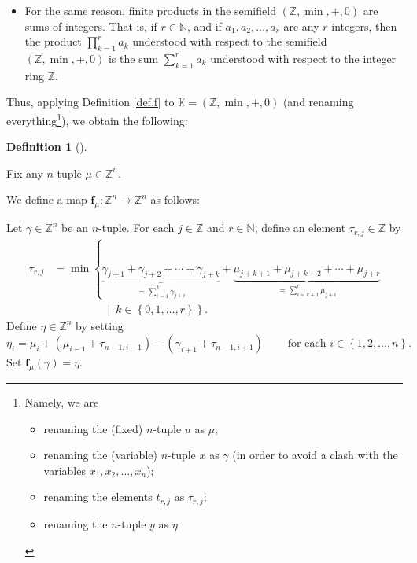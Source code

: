 \documentclass[numbers=enddot,12pt,final,onecolumn,notitlepage]{scrartcl}%
\theoremstyle{definition}
\newtheorem{defi}[theo]{Definition}
\newenvironment{definition}[1][]
{\begin{defi}[#1]\begin{leftbar}}
{\end{leftbar}\end{defi}}
\let\sumnonlimits\sum
\let\prodnonlimits\prod
\renewcommand{\sum}{\sumnonlimits\limits}
\renewcommand{\prod}{\prodnonlimits\limits}
\begin{document}
\begin{itemize}
\item For the same reason, finite products in the semifield $\left(
\mathbb{Z},\min,+,0\right)  $ are sums of integers. That is, if $r\in
\mathbb{N}$, and if $a_{1},a_{2},\ldots,a_{r}$ are any $r$ integers, then the
product $\prod_{k=1}^{r}a_{k}$ understood with respect to the semifield
$\left(  \mathbb{Z},\min,+,0\right)  $ is the sum $\sum_{k=1}^{r}a_{k}$
understood with respect to the integer ring $\mathbb{Z}$.
\end{itemize}

Thus, applying Definition \ref{def.f} to $\mathbb{K}=\left(  \mathbb{Z}%
,\min,+,0\right)  $ (and renaming everything\footnote{Namely, we are
\par
\begin{itemize}
\item renaming the (fixed) $n$-tuple $u$ as $\mu$;
\par
\item renaming the (variable) $n$-tuple $x$ as $\gamma$ (in order to avoid a
clash with the variables $x_{1},x_{2},\ldots,x_{n}$);
\par
\item renaming the elements $t_{r,j}$ as $\tau_{r,j}$;
\par
\item renaming the $n$-tuple $y$ as $\eta$.
\end{itemize}
\par
{}}), we obtain the following:

\begin{definition}
\label{def.fZ}Fix any $n$-tuple $\mu\in\mathbb{Z}^{n}$.

We define a map $\mathbf{f}_{\mu}:\mathbb{Z}^{n}\rightarrow\mathbb{Z}^{n}$ as follows:

Let $\gamma\in\mathbb{Z}^{n}$ be an $n$-tuple. For each $j\in\mathbb{Z}$ and
$r\in\mathbb{N}$, define an element $\tau_{r,j}\in\mathbb{Z}$ by
\begin{align*}
\tau_{r,j}  &  =\min\left\{  \underbrace{\gamma_{j+1}+\gamma_{j+2}%
+\cdots+\gamma_{j+k}}_{=\sum_{i=1}^{k}\gamma_{j+i}}+\underbrace{\mu
_{j+k+1}+\mu_{j+k+2}+\cdots+\mu_{j+r}}_{=\sum_{i=k+1}^{r}\mu_{j+i}}\right. \\
&  \ \ \ \ \ \ \ \ \ \ \ \ \ \ \ \ \ \ \ \ \left.  \ \mid\ k\in\left\{
0,1,\ldots,r\right\}  \right\}  .
\end{align*}
Define $\eta\in\mathbb{Z}^{n}$ by setting%
\[
\eta_{i}=\mu_{i}+\left(  \mu_{i-1}+\tau_{n-1,i-1}\right)  -\left(
\gamma_{i+1}+\tau_{n-1,i+1}\right)  \ \ \ \ \ \ \ \ \ \ \text{for each }%
i\in\left\{  1,2,\ldots,n\right\}  .
\]
Set $\mathbf{f}_{\mu}\left(  \gamma\right)  =\eta$.
\end{definition}
\end{document}
